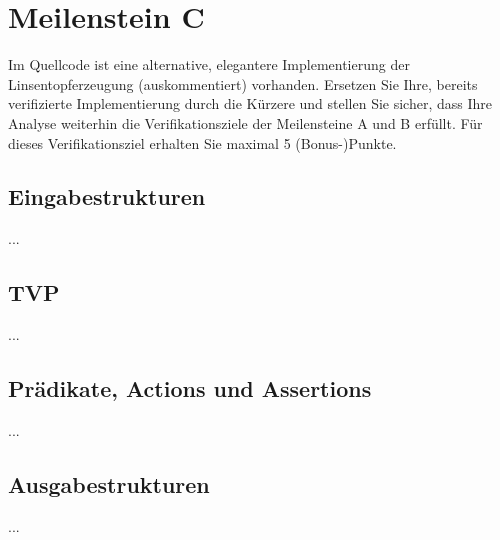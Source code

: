 \section{Meilenstein C}
Im Quellcode ist eine alternative, elegantere Implementierung der Linsentopferzeugung (auskommentiert) vorhanden. Ersetzen Sie Ihre, bereits verifizierte Implementierung durch die Kürzere und stellen Sie sicher, dass Ihre Analyse weiterhin die Verifikationsziele der Meilensteine A und B erfüllt.
Für dieses Verifikationsziel erhalten Sie maximal 5 (Bonus-)Punkte.


\subsection{Eingabestrukturen}
...


\subsection{TVP}
...


\subsection{Prädikate, Actions und Assertions}
...


\subsection{Ausgabestrukturen}
...